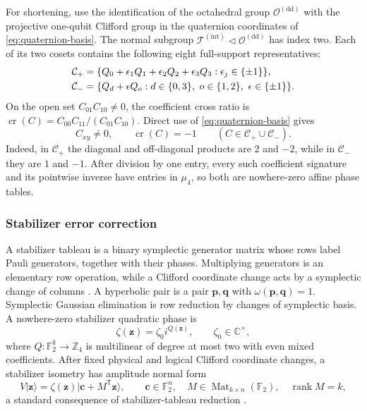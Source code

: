 \documentclass[11pt,letterpaper,onecolumn]{article}
\theoremstyle{plain}
\theoremstyle{definition}
\theoremstyle{remark}
\newcommand{\Ftwo}{\mathbb F_2}
\newcommand{\TetInt}{{\mathcal T^{(\mathrm{int})}}}
\newcommand{\OctDD}{{\mathcal O^{(\mathrm{dd})}}}
\newcommand{\Mat}{\operatorname{Mat}}
\newcommand{\rank}{\operatorname{rank}}
\begin{document}
For shortening, use the identification of the octahedral group
\(\OctDD\) with the projective one-qubit Clifford group in the
quaternion coordinates of \cref{eq:quaternion-basis}.  The normal subgroup
\(\TetInt\triangleleft\OctDD\) has index two.  Each of its two cosets
contains the following eight full-support representatives:
\begin{align}
 \mathcal C_+
 &=\{Q_0+\epsilon_1Q_1+\epsilon_2Q_2+\epsilon_3Q_3:
       \epsilon_j\in\{\pm1\}\},\notag\\
 \mathcal C_-
 &=\{Q_d+\epsilon Q_o:
       d\in\{0,3\},\ o\in\{1,2\},\ \epsilon\in\{\pm1\}\}.
 \label{eq:a4rel-full-support-cosets}
\end{align}
On the open set \(C_{01}C_{10}\ne0\), the coefficient cross ratio is \(\operatorname{cr}(C)=C_{00}C_{11}/(C_{01}C_{10})\).  Direct use of
\cref{eq:quaternion-basis} gives
\begin{equation}
 C_{xy}\ne0,\qquad \operatorname{cr}(C)=-1
 \qquad(C\in\mathcal C_+\cup\mathcal C_-).
 \label{eq:a4rel-full-support-cross-ratio}
\end{equation}
Indeed, in \(\mathcal C_+\) the diagonal and off-diagonal products are
\(2\) and \(-2\), while in \(\mathcal C_-\) they are \(1\) and \(-1\).
After division by one entry, every such coefficient signature and its pointwise inverse
have entries in \(\mu_4\), so both are nowhere-zero affine phase tables.

\subsubsection{Stabilizer error correction}
\label{subsubsec:stabilizer-error-correction}

A stabilizer tableau is a binary symplectic generator matrix whose rows label
Pauli generators, together with their phases. Multiplying generators is an
elementary row operation, while a Clifford coordinate change acts by a
symplectic change of columns \cite[Chapter~4]{Gottesman1997}.  A hyperbolic
pair is a pair \({\mathbf{p}},{\mathbf{q}}\) with
\(\omega({\mathbf{p}},{\mathbf{q}})=1\). Symplectic Gaussian elimination is row reduction by
changes of symplectic basis.  A nowhere-zero stabilizer quadratic phase is
\[
 \zeta({\mathbf z})=\zeta_0i^{Q({\mathbf z})},\qquad \zeta_0\in\mathbb C^\times,
\]
where \(Q:\Ftwo^k\to\mathbb Z_4\) is multilinear of degree at most two with
even mixed coefficients.  After fixed physical and logical Clifford
coordinate changes, a stabilizer isometry has amplitude normal form
\[
 V|{\mathbf z}\rangle=\zeta({\mathbf z})|{\mathbf{c}}+M^{\mathsf T}{\mathbf z}\rangle,
 \qquad
 {\mathbf{c}}\in\Ftwo^n,\quad M\in\Mat_{k\times n}(\Ftwo),\quad\rank M=k,
\]
a standard consequence of stabilizer-tableau reduction
\cite[Chapter~4]{Gottesman1997}.
\end{document}
